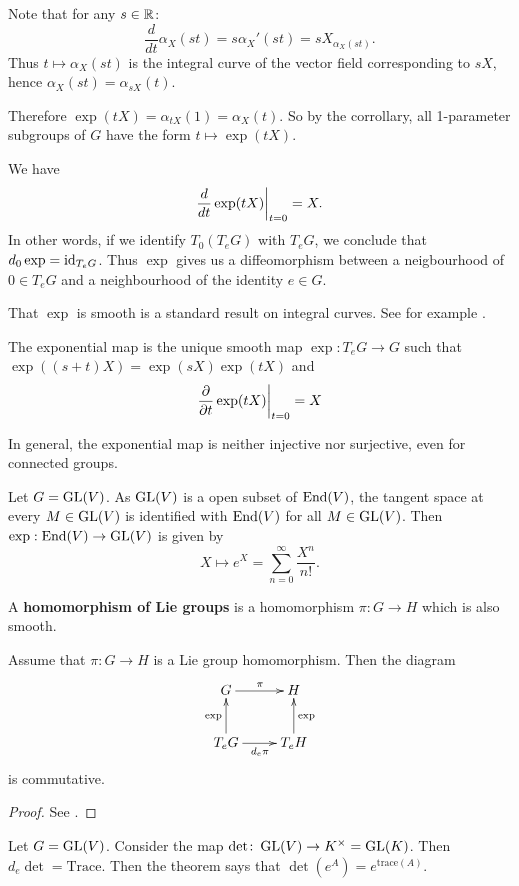 \documentclass[11pt, english]{article}
\begin{document}
Note that for any $s \in \mathbb{R}$:
$$
\frac{d}{dt} \alpha_X (st) = s \alpha_X'(st) = s X_{\alpha_X(st)}.
$$
Thus $t \mapsto \alpha_X(st)$ is the integral curve of the vector field corresponding to $sX$, hence $\alpha_X(st)= \alpha_{sX}(t)$. 

Therefore $\exp(tX)=\alpha_{tX}(1) = \alpha_X(t)$. So by the corrollary, all 1-parameter subgroups of $G$ have the form $t \mapsto \exp(tX)$. 

We have
$$
\restr{\frac{d}{dt} \exp(tX)}{t=0} = X.
$$
In other words, if we identify $T_0(T_eG)$ with $T_eG$, we conclude that $d_0 \exp = \text{id}_{T_eG}$. Thus $\exp$ gives us a diffeomorphism between a neigbourhood of $0 \in T_eG$ and a neighbourhood of the identity $e \in G$.

That $\exp$ is smooth is a standard result on integral curves. See for example \cite{spivak_manifolds}.

\begin{thm}
  The exponential map is the unique smooth map $\exp:T_eG \to G$ such that $\exp((s+t)X) = \exp(sX)\exp(tX)$ and
$$
\restr{\dd{}{t} \exp(tX)}{t=0}=X
$$
\end{thm}
In general, the exponential map is neither injective nor surjective, even for connected groups.
\begin{example}
Let $G = \operatorname{GL}(V)$. As $\operatorname{GL}(V)$ is a open subset of $\operatorname{End}(V)$, the tangent space at every $M \in \operatorname{GL}(V)$ is identified with $\operatorname{End}(V)$ for all $M \in \operatorname{GL}(V)$. Then $\exp:\operatorname{End}(V) \to \operatorname{GL}(V)$ is given by 
$$
X \mapsto e^X = \sum_{n=0}^\infty \frac{X^n}{n!}.
$$
\end{example}

A \textbf{homomorphism of Lie groups} is a homomorphism $\pi:G \to H$ which is also smooth.

\begin{thm}
 Assume that $\pi:G \to H$ is a Lie group homomorphism. Then the diagram
$$
\xymatrix{
G \ar[r]^\pi & H \\
T_eG \ar[u]^{\exp} \ar[r]_{d_e\pi} & T_e H \ar[u]_\exp
}
$$
is commutative.
\end{thm}
\begin{proof}
See \cite{spivak_manifolds}.
\end{proof}


\begin{example}
  Let $G = \operatorname{GL}(V)$. Consider the map $\det \colon \operatorname{GL}(V) \to K^\times = \operatorname{GL}(K)$. Then $d_e \det = \mathrm{Trace}$. Then the theorem says that $\det(e^A)=e^{\mathrm{trace}(A)}$.
\end{example}
\end{document}
